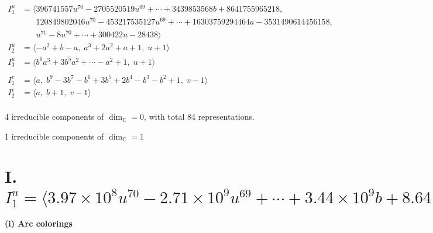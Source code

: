 \documentclass[1p]{elsarticle_modified}
\theoremstyle{definition}
\begin{document}
\begin{align*}
I^u_{1}&=\langle 
396741557 u^{70}-2705520519 u^{69}+\cdots+3439853568 b+8641755965218,\\
\phantom{I^u_{1}}&\phantom{= \langle  }120849802046 u^{70}-453217535127 u^{69}+\cdots+16303759294464 a-3531490614456158,\\
\phantom{I^u_{1}}&\phantom{= \langle  }u^{71}-8 u^{70}+\cdots+300422 u-28438\rangle \\
I^u_{2}&=\langle 
- a^2+b- a,\;a^3+2 a^2+a+1,\;u+1\rangle \\
I^u_{3}&=\langle 
b^6 a^3+3 b^5 a^2+\cdots- a^2+1,\;u+1\rangle \\
\\
I^v_{1}&=\langle 
a,\;b^9-3 b^7- b^6+3 b^5+2 b^4- b^3- b^2+1,\;v-1\rangle \\
I^v_{2}&=\langle 
a,\;b+1,\;v-1\rangle \\
\end{align*}
\raggedright * 4 irreducible components of $\dim_{\mathbb{C}}=0$, with total 84 representations.\\
\raggedright * 1 irreducible components of $\dim_{\mathbb{C}}=1$ \\
\newpage
\renewcommand{\arraystretch}{1}
\centering \section*{I. $I^u_{1}= \langle 3.97\times10^{8} u^{70}-2.71\times10^{9} u^{69}+\cdots+3.44\times10^{9} b+8.64\times10^{12},\;1.21\times10^{11} u^{70}-4.53\times10^{11} u^{69}+\cdots+1.63\times10^{13} a-3.53\times10^{15},\;u^{71}-8 u^{70}+\cdots+300422 u-28438 \rangle$}
\flushleft \textbf{(i) Arc colorings}\\
\end{document}
